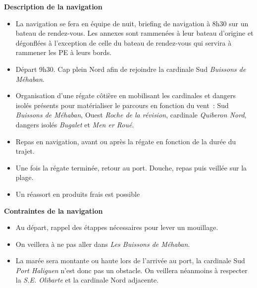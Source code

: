 \begin{minipage}[c][\textheight][t]{0.10\textwidth}
\hfill
\end{minipage}%
\begin{minipage}[c][\textheight][t]{0.50\textwidth}
    \vspace{4cm}
    \color{StrongBlue}    
    {\huge \textbf{Description de la navigation}}\\
            \begin{itemize}
                \item La navigation se fera en équipe de nuit, briefing de navigation à 8h30 sur un bateau de rendez-vous. Les annexes sont rammenées à leur bateau d'origine et dégonflées à l'exception de celle du bateau de rendez-vous qui servira à rammener les PE à leurs bords.  
                \item Départ 9h30. Cap plein Nord afin de rejoindre la cardinale Sud \textit{Buissons de Méhaban}. 
                \item Organisation d'une régate côtière en mobilisant les cardinales et dangers isolés présents pour matérialiser le parcours en fonction du vent~: Sud \textit{Buissons de Méhaban}, Ouest \textit{Roche de la révision}, cardinale \textit{Quiberon Nord}, dangers isolés \textit{Bugalet} et \textit{Men er Roué}.
                \item Repas en navigation, avant ou après la régate en fonction de la durée du trajet.  
                \item Une fois la régate terminée, retour au port. Douche, repas puis veillée sur la plage. 
                \item Un réassort en produits frais est possible 
            \end{itemize}
        {
        \huge \textbf{Contraintes de la navigation}}\\
            \begin{itemize}
                \item Au départ, rappel des étappes nécessaires pour lever un mouillage. 
                \item On veillera à ne pas aller dans \textit{Les Buissons de Méhaban}.
                \item La marée sera montante ou haute lors de l'arrivée au port, la cardinale Sud \textit{Port Haliguen} n'est donc pas un obstacle. On veillera néanmoins à respecter la \textit{S.E. Olibarte} et la cardinale Nord adjacente. 
            \end{itemize}
\end{minipage}%
